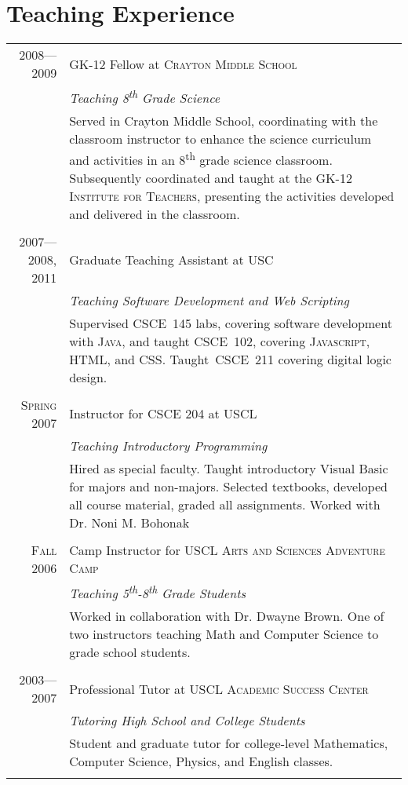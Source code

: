 \documentclass[a4paper,10pt]{article}
\begin{document}
\section{Teaching Experience}
\begin{longtable}{r|p{11cm}}
\textsc{2008---2009}
& GK-12 Fellow at \textsc{Crayton Middle School} \\
&\emph{Teaching 8\textsuperscript{th} Grade Science}\\
&\footnotesize{Served in Crayton Middle School, coordinating with the classroom instructor to enhance the science curriculum and activities in an 8\textsuperscript{th} grade science classroom. Subsequently coordinated and taught at the \textsc{GK-12 Institute for Teachers}, presenting the activities developed and delivered in the classroom.}
\\\multicolumn{2}{c}{} \\
\textsc{2007---2008, 2011} & Graduate Teaching Assistant at \textsc{USC} \\
&\emph{Teaching Software Development and Web Scripting}\\
&\footnotesize{Supervised CSCE~145 labs, covering software development with \textsc{Java}, and taught CSCE~102, covering \textsc{Javascript}, \textsc{HTML}, and \textsc{CSS}. Taught~CSCE~211 covering digital logic design.}\\\multicolumn{2}{c}{} \\
\textsc{Spring 2007} &  Instructor for \textsc{CSCE 204} at \textsc{USCL} \\
&\emph{Teaching Introductory Programming}\\
&\footnotesize{Hired as special faculty. Taught introductory Visual Basic for majors and non-majors. Selected textbooks, developed all course material, graded all assignments. Worked with Dr. Noni M. Bohonak}\\\multicolumn{2}{c}{} \\
\textsc{Fall 2006} & Camp Instructor for \textsc{USCL Arts and Sciences Adventure Camp} \\
&\emph{Teaching 5\textsuperscript{th}-8\textsuperscript{th} Grade Students}\\
&\footnotesize{Worked in collaboration with Dr. Dwayne Brown. One of two instructors teaching Math and Computer Science to grade school students.}\\\multicolumn{2}{c}{} \\
\textsc{2003---2007} & Professional Tutor at \textsc{USCL Academic Success Center} \\
&\emph{Tutoring High School and College Students}\\
&\footnotesize{Student and graduate tutor for college-level Mathematics, Computer Science, Physics, and English classes.}\\\multicolumn{2}{c}{} \\
\end{longtable}
\end{document}
